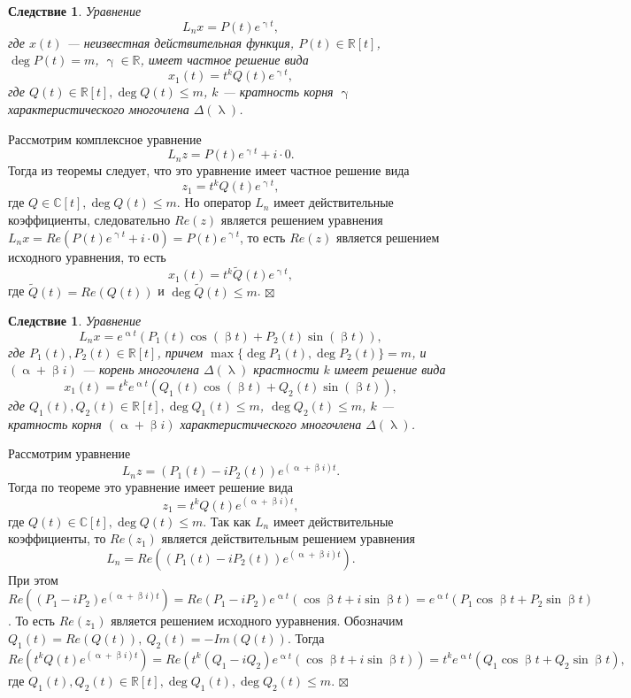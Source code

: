 \documentclass[a4paper, 12pt]{report}
\newenvironment{Proof} %
{\par\noindent{$\blacklozenge$}} %
{\hfill$\scriptstyle\boxtimes$}
\newcommand{\Rm}{\mathbb{R}}
\newcommand{\Cm}{\mathbb{C}}
\renewcommand{\alpha}{\upalpha}
\renewcommand{\beta}{\upbeta}
\renewcommand{\lambda}{\uplambda}
\begin{document}
\newtheorem*{2_5_2}{Следствие}\begin{2_5_2}
	Уравнение $$L_nx = P(t)e^{\upgamma t},$$ где $x(t)$ --- неизвестная действительная функция, $P(t)\in\Rm[t]$, $\deg P(t) = m$, $\upgamma \in \Rm$, имеет частное решение вида $$x_1(t) = t^kQ(t)e^{\upgamma t},$$ где $Q(t) \in \Rm[t], \deg Q(t) \leqslant m$, $k$ --- кратность корня $\upgamma$ характеристического многочлена $\Delta(\lambda)$.
\end{2_5_2}\begin{Proof}
Рассмотрим комплексное уравнение $$L_nz = P(t) e^{\upgamma t} + i\cdot 0.$$ Тогда из теоремы следует, что это уравнение имеет частное решение вида $$z_1 = t^kQ(t)e^{\upgamma t},$$ где $Q\in \Cm[t], \deg Q(t)\leqslant m$. Но оператор $L_n$ имеет действительные коэффициенты, следовательно $Re(z)$ является решением уравнения $L_nx = Re(P(t) e^{\upgamma t} + i\cdot 0) = P(t) e^{\upgamma t}$, то есть $Re(z)$ является решением исходного уравнения, то есть $$x_1(t) = t^k\widetilde{Q}(t)e^{\upgamma t},$$ где $\widetilde{Q}(t) = Re(Q(t))$ и $\deg \widetilde{Q}(t)\leqslant m$.
\end{Proof}
\newtheorem*{2_5_3}{Следствие}\begin{2_5_3}
	Уравнение $$L_nx = e^{\alpha t}(P_1(t)\cos(\beta t) + P_2(t)\sin (\beta t)),$$ где $P_1(t),P_2(t)\in \Rm[t]$, причем $\max\{\deg P_1(t),\deg P_2(t)\} = m$, и $(\alpha + \beta i)$ --- корень многочлена $\Delta (\lambda)$ крастности $k$ имеет решение вида $$x_1(t) = t^ke^{\alpha t}(Q_1(t)\cos(\beta t) + Q_2(t)\sin(\beta t)),$$ где $Q_1(t), Q_2(t) \in \Rm[t], \deg Q_1(t) \leqslant m$, $\deg Q_2(t) \leqslant m$, $k$ --- кратность корня $(\alpha + \beta i)$ характеристического многочлена $\Delta(\lambda)$.
\end{2_5_3}\begin{Proof}
Рассмотрим уравнение $$L_nz = (P_1(t) - i P_2(t))e^{(\alpha + \beta i)t}.$$ Тогда по теореме это уравнение имеет решение вида $$z_1= t^kQ(t)e^{(\alpha + \beta i)t},$$ где $Q(t)\in \Cm[t], \deg Q(t)\leqslant m$. Так как $L_n$ имеет действительные коэффициенты, то $Re(z_1)$ является действительным решением уравнения $$L_n = Re((P_1(t) - i P_2(t))e^{(\alpha + \beta i)t}).$$ При этом $Re((P_1 - i P_2)e^{(\alpha + \beta i)t}) = Re(P_1 - iP_2)e^{\alpha t}(\cos \beta t + i \sin \beta t) = e^{\alpha t}(P_1 \cos \beta t  + P_2 \sin \beta t)$. То есть $Re(z_1)$ является решением исходного ууравнения. Обозначим $Q_1(t) = Re(Q(t)),\ Q_2(t) = -Im(Q(t))$. Тогда $$Re(t^kQ(t)e^{(\alpha + \beta i)t}) = Re(t^k(Q_1 - i Q_2)e^{\alpha t}(\cos \beta t + i \sin \beta t)) = t^ke^{\alpha t}(Q_1\cos \beta t + Q_2 \sin \beta t),$$ где $Q_1(t), Q_2(t) \in \Rm[t], \deg Q_1(t), \deg Q_2(t) \leqslant m$. 
\end{Proof}
\end{document}
